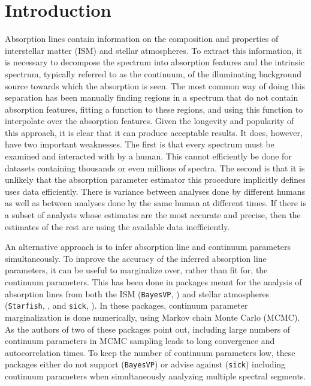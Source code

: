\documentclass[manuscript]{aastex62}
\begin{document}
\section{Introduction}
\label{sec:introduction}
Absorption lines contain information on the composition and properties of interstellar matter (ISM) and stellar atmospheres.
To extract this information, it is necessary to decompose the spectrum into absorption features and the intrinsic spectrum, typically referred to as the continuum, of the illuminating background source towards which the absorption is seen.
The most common way of doing this separation has been manually finding regions in a spectrum that do not contain absorption features, fitting a function to these regions, and using this function to interpolate over the absorption features.
Given the longevity and popularity of this approach, it is clear that it can produce acceptable results.
It does, however, have two important weaknesses.
The first is that every spectrum must be examined and interacted with by a human.
This cannot efficiently be done for datasets containing thousands or even millions of spectra.
The second is that it is unlikely that the absorption parameter estimator this procedure implicitly defines uses data efficiently.
There is variance between analyses done by different humans as well as between analyses done by the same human at different times.
If there is a subset of analysts whose estimates are the most accurate and precise, then the estimates of the rest are using the available data inefficiently.

An alternative approach is to infer absorption line and continuum parameters simultaneously.
To improve the accuracy of the inferred absorption line parameters, it can be useful to marginalize over, rather than fit for, the continuum parameters.
This has been done in packages meant for the analysis of absorption lines from both the ISM (\texttt{BayesVP}, \citealt{Liang:2018kq}) and stellar atmospheres (\texttt{Starfish}, \citealt{2015ApJ...812..128C}, and \texttt{sick}, \citealt{2016ApJS..223....8C}).
In these packages, continuum parameter marginalization is done numerically, using Markov chain Monte Carlo (MCMC).
As the authors of two of these packages point out, including large numbers of continuum parameters in MCMC sampling leads to long convergence and autocorrelation times.
To keep the number of continuum parameters low, these packages either do not support (\texttt{BayesVP}) or advise against (\texttt{sick}) including continuum parameters when simultaneously analyzing multiple spectral segments.
\end{document}
